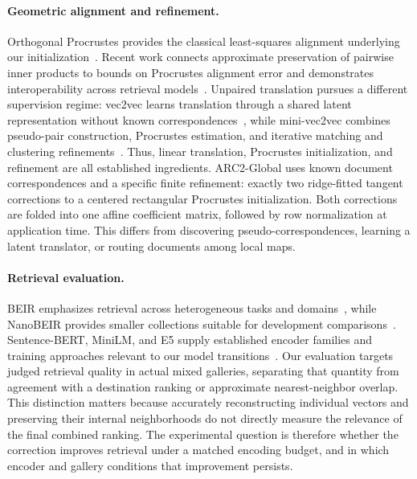 \paragraph{Geometric alignment and refinement.}
Orthogonal Procrustes provides the classical least-squares alignment underlying our initialization~\cite{schonemann1966procrustes}.
Recent work connects approximate preservation of pairwise inner products to bounds on Procrustes alignment error and demonstrates interoperability across retrieval models~\cite{maystre2025procrustes}.
Unpaired translation pursues a different supervision regime: vec2vec learns translation through a shared latent representation without known correspondences~\cite{jha2025geometry}, while mini-vec2vec combines pseudo-pair construction, Procrustes estimation, and iterative matching and clustering refinements~\cite{dar2025mini}.
Thus, linear translation, Procrustes initialization, and refinement are all established ingredients.
ARC2-Global uses known document correspondences and a specific finite refinement: exactly two ridge-fitted tangent corrections to a centered rectangular Procrustes initialization.
Both corrections are folded into one affine coefficient matrix, followed by row normalization at application time.
This differs from discovering pseudo-correspondences, learning a latent translator, or routing documents among local maps.

\paragraph{Retrieval evaluation.}
BEIR emphasizes retrieval across heterogeneous tasks and domains~\cite{beir2021}, while NanoBEIR provides smaller collections suitable for development comparisons~\cite{nanobeir}.
Sentence-BERT, MiniLM, and E5 supply established encoder families and training approaches relevant to our model transitions~\cite{sbert2019,minilm2020,e52022}.
Our evaluation targets judged retrieval quality in actual mixed galleries, separating that quantity from agreement with a destination ranking or approximate nearest-neighbor overlap.
This distinction matters because accurately reconstructing individual vectors and preserving their internal neighborhoods do not directly measure the relevance of the final combined ranking.
The experimental question is therefore whether the correction improves retrieval under a matched encoding budget, and in which encoder and gallery conditions that improvement persists.
